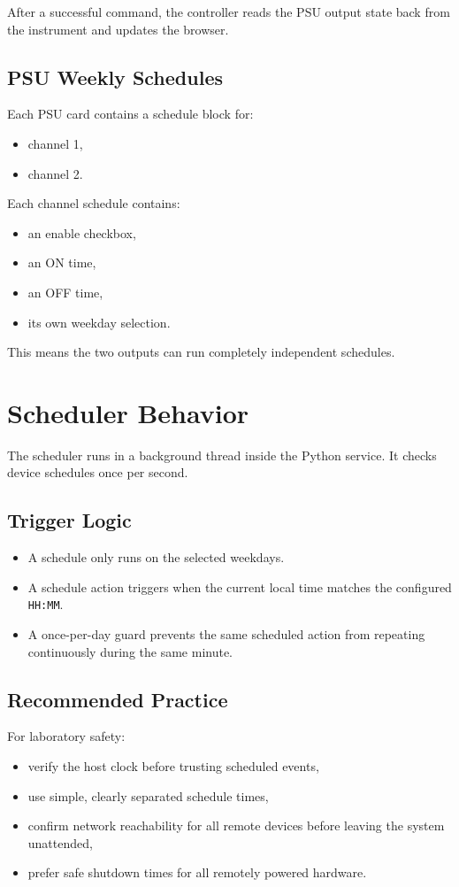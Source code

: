 \documentclass[11pt,a4paper]{article}
\begin{document}
After a successful command, the controller reads the PSU output state back from the instrument and updates the browser.

\subsection{PSU Weekly Schedules}
Each PSU card contains a schedule block for:
\begin{itemize}[leftmargin=1.5em]
    \item channel 1,
    \item channel 2.
\end{itemize}

Each channel schedule contains:
\begin{itemize}[leftmargin=1.5em]
    \item an enable checkbox,
    \item an ON time,
    \item an OFF time,
    \item its own weekday selection.
\end{itemize}

This means the two outputs can run completely independent schedules.

\section{Scheduler Behavior}
The scheduler runs in a background thread inside the Python service. It checks device schedules once per second.

\subsection{Trigger Logic}
\begin{itemize}[leftmargin=1.5em]
    \item A schedule only runs on the selected weekdays.
    \item A schedule action triggers when the current local time matches the configured \texttt{HH:MM}.
    \item A once-per-day guard prevents the same scheduled action from repeating continuously during the same minute.
\end{itemize}

\subsection{Recommended Practice}
For laboratory safety:
\begin{itemize}[leftmargin=1.5em]
    \item verify the host clock before trusting scheduled events,
    \item use simple, clearly separated schedule times,
    \item confirm network reachability for all remote devices before leaving the system unattended,
    \item prefer safe shutdown times for all remotely powered hardware.
\end{itemize}
\end{document}
